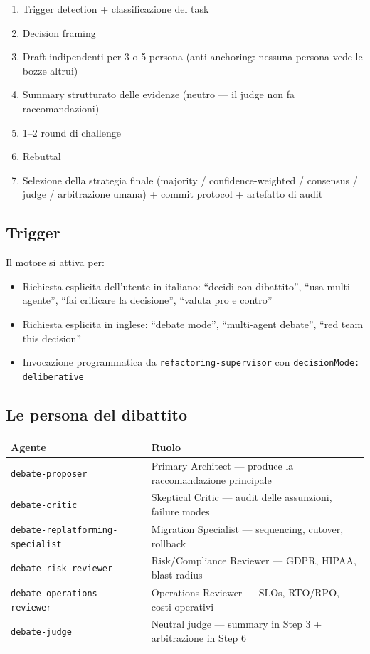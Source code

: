\documentclass[12pt,a4paper,twoside]{book}
\begin{document}
\begin{enumerate}
  \item Trigger detection + classificazione del task
  \item Decision framing
  \item Draft indipendenti per 3 o 5 persona (anti-anchoring: nessuna persona vede le bozze altrui)
  \item Summary strutturato delle evidenze (neutro — il judge non fa raccomandazioni)
  \item 1--2 round di challenge
  \item Rebuttal
  \item Selezione della strategia finale (majority / confidence-weighted / consensus / judge / arbitrazione umana) + commit protocol + artefatto di audit
\end{enumerate}

\subsection{Trigger}

Il motore si attiva per:
\begin{itemize}
  \item Richiesta esplicita dell'utente in italiano: ``decidi con dibattito'', ``usa multi-agente'', ``fai criticare la decisione'', ``valuta pro e contro''
  \item Richiesta esplicita in inglese: ``debate mode'', ``multi-agent debate'', ``red team this decision''
  \item Invocazione programmatica da \texttt{refactoring-supervisor} con \texttt{decisionMode: deliberative}
\end{itemize}

\subsection{Le persona del dibattito}

\begin{center}
\begin{tabular}{ll}
\toprule
\textbf{Agente} & \textbf{Ruolo} \\
\midrule
\texttt{debate-proposer} & Primary Architect — produce la raccomandazione principale \\
\texttt{debate-critic} & Skeptical Critic — audit delle assunzioni, failure modes \\
\texttt{debate-replatforming-specialist} & Migration Specialist — sequencing, cutover, rollback \\
\texttt{debate-risk-reviewer} & Risk/Compliance Reviewer — GDPR, HIPAA, blast radius \\
\texttt{debate-operations-reviewer} & Operations Reviewer — SLOs, RTO/RPO, costi operativi \\
\texttt{debate-judge} & Neutral judge — summary in Step 3 + arbitrazione in Step 6 \\
\bottomrule
\end{tabular}
\end{center}
\end{document}
